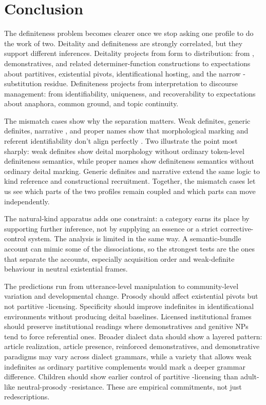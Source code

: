 \documentclass[12pt,letterpaper]{article}
\begin{document}
\section{Conclusion}\label{sec:conclusion}

The definiteness problem becomes clearer once we stop asking one profile to do the work of two. Deitality and definiteness are strongly correlated, but they support different inferences. Deitality projects from form to distribution: from , demonstratives, and related determiner-function constructions to expectations about partitives, existential pivots, identificational hosting, and the narrow -substitution residue. Definiteness projects from interpretation to discourse management: from identifiability, uniqueness, and recoverability to expectations about anaphora, common ground, and topic continuity.

The mismatch cases show why the separation matters. Weak definites, generic definites, narrative , and proper names show that morphological marking and referent identifiability don't align perfectly \parencite{FrancisMichaelis2003}. Two illustrate the point most sharply: weak definites show deital morphology without ordinary token-level definiteness semantics, while proper names show definiteness semantics without ordinary deital marking. Generic definites and narrative  extend the same logic to kind reference and constructional recruitment. Together, the mismatch cases let us see which parts of the two profiles remain coupled and which parts can move independently.

The natural-kind apparatus adds one constraint: a category earns its place by supporting further inference, not by supplying an essence or a strict corrective-control system. The analysis is limited in the same way. A semantic-bundle account can mimic some of the dissociations, so the strongest tests are the ones that separate the accounts, especially acquisition order and weak-definite behaviour in neutral existential frames.

The predictions run from utterance-level manipulation to community-level variation and developmental change. Prosody should affect existential pivots but not partitive -licensing. Specificity should improve indefinites in identificational environments without producing deital baselines. Licensed institutional frames should preserve institutional readings where demonstratives and genitive NPs tend to force referential ones. Broader dialect data should show a layered pattern: article realization, article presence, reinforced demonstratives, and demonstrative paradigms may vary across dialect grammars, while a variety that allows weak indefinites as ordinary partitive  complements would mark a deeper grammar difference. Children should show earlier control of partitive -licensing than adult-like neutral-prosody -resistance. These are empirical commitments, not just redescriptions.
\end{document}

